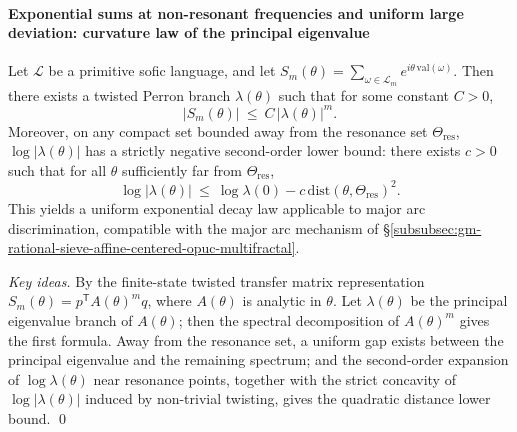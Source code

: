 \begin{proposition}
\paragraph{Exponential sums at non-resonant frequencies and uniform large deviation: curvature law of the principal eigenvalue}
\begin{proposition}\label{prop:gm-nonresonant-exp-sum-curvature}
Let \(\mathcal{L}\) be a primitive sofic language, and let
\(
S_m(\theta)=\sum_{\omega\in\mathcal{L}_m} e^{i\theta\,\mathrm{val}(\omega)}
\).
Then there exists a twisted Perron branch \(\lambda(\theta)\) such that for some constant \(C>0\),
\[
|S_m(\theta)|\ \le\ C\,|\lambda(\theta)|^{m}.
\]
Moreover, on any compact set bounded away from the resonance set \(\Theta_{\mathrm{res}}\), \(\log|\lambda(\theta)|\) has a strictly negative second-order lower bound: there exists \(c>0\) such that for all \(\theta\) sufficiently far from \(\Theta_{\mathrm{res}}\),
\[
\log|\lambda(\theta)|\ \le\ \log\lambda(0)-c\,\mathrm{dist}(\theta,\Theta_{\mathrm{res}})^2.
\]
This yields a uniform exponential decay law applicable to major arc discrimination, compatible with the major arc mechanism of \S\ref{subsubsec:gm-rational-sieve-affine-centered-opuc-multifractal}.
\end{proposition}

\begin{proof}[Key ideas]
By the finite-state twisted transfer matrix representation \(S_m(\theta)=p^{\mathsf T}A(\theta)^{m}q\), where \(A(\theta)\) is analytic in \(\theta\).
Let \(\lambda(\theta)\) be the principal eigenvalue branch of \(A(\theta)\); then the spectral decomposition of \(A(\theta)^m\) gives the first formula.
Away from the resonance set, a uniform gap exists between the principal eigenvalue and the remaining spectrum; and the second-order expansion of \(\log\lambda(\theta)\) near resonance points, together with the strict concavity of \(\log|\lambda(\theta)|\) induced by non-trivial twisting, gives the quadratic distance lower bound. \qed
\end{proof}


\end{proposition}
